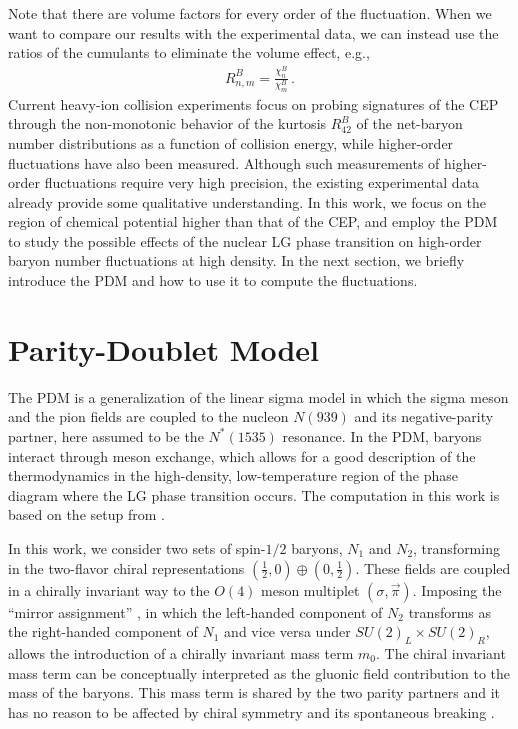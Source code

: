 \documentclass[aps,twocolumn,prd,superscriptaddress,nofootinbib,floatfix]{revtex4-2}
\begin{document}
Note that there are volume factors for every order of the fluctuation. When we want to compare our results with the experimental data, we can instead use the ratios of the cumulants to eliminate the volume effect, e.g.,
%
\begin{align}
R^B_{n,m}=\frac{\chi^B_n}{\chi^B_m}\,.
\end{align}
%
Current heavy-ion collision experiments focus on probing signatures of the CEP through the non-monotonic behavior of the kurtosis $R^B_{42}$ of the net-baryon number distributions as a function of collision energy, while higher-order fluctuations have also been measured. Although such measurements of higher-order fluctuations require very high precision, the existing experimental data already provide some qualitative understanding. In this work, we focus on the region of chemical potential higher than that of the CEP, and employ the PDM to study the possible effects of the nuclear LG phase transition on high-order baryon number fluctuations at high density. In the next section, we briefly introduce the PDM and how to use it to compute the fluctuations.
\section{Parity-Doublet Model}
\label{sec:PDM}

The PDM is a generalization of the linear sigma model \cite{Gell-Mann:1960mvl} in which the sigma meson and the pion fields are coupled to the nucleon $N(939)$ and its negative-parity partner, here assumed to be the $N^*(1535)$ resonance. In the PDM, baryons interact through meson exchange, which allows for a good description of the thermodynamics in the high-density, low-temperature region of the phase diagram where the LG phase transition occurs. The computation in this work is based on the setup from \cite{Recchi:2025pyy}.

In this work, we consider two sets of spin-$1/2$ baryons, $N_1$ and $N_2$, transforming in the two-flavor chiral representations $(\tfrac{1}{2},0)\oplus(0,\tfrac{1}{2})$. These fields are coupled in a chirally invariant way to the $O(4)$ meson multiplet $(\sigma,\vec\pi)$. Imposing the “mirror assignment” \cite{Jido:1998av}, in which the left-handed component of $N_2$ transforms as the right-handed component of $N_1$ and vice versa under $SU(2)_L\times SU(2)_R$, allows the introduction of a chirally invariant mass term $m_0$. The chiral invariant mass term can be conceptually interpreted as the gluonic field contribution to the mass of the baryons. This mass term is shared by the two parity partners and it has no reason to be affected by chiral symmetry and its spontaneous breaking \cite{Yang:2018nqn}.
\end{document}
